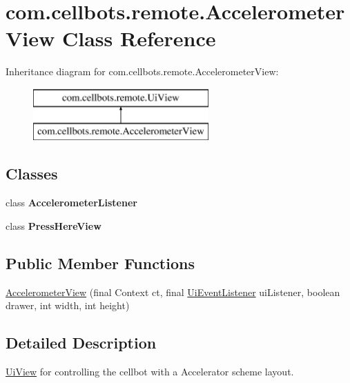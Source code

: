 \hypertarget{classcom_1_1cellbots_1_1remote_1_1_accelerometer_view}{\section{com.\-cellbots.\-remote.\-Accelerometer\-View Class Reference}
\label{classcom_1_1cellbots_1_1remote_1_1_accelerometer_view}
}
Inheritance diagram for com.\-cellbots.\-remote.\-Accelerometer\-View\-:\begin{figure}[H]
\begin{center}
\leavevmode
\includegraphics[height=2.000000cm]{classcom_1_1cellbots_1_1remote_1_1_accelerometer_view}
\end{center}
\end{figure}
\subsection*{Classes}
\begin{DoxyCompactItemize}
\item 
class {\bfseries Accelerometer\-Listener}
\item 
class {\bfseries Press\-Here\-View}
\end{DoxyCompactItemize}
\subsection*{Public Member Functions}
\begin{DoxyCompactItemize}
\item 
\hyperlink{classcom_1_1cellbots_1_1remote_1_1_accelerometer_view_a965761c3c06f21c278363186777bcd9c}{Accelerometer\-View} (final Context ct, final \hyperlink{interfacecom_1_1cellbots_1_1remote_1_1_ui_view_1_1_ui_event_listener}{Ui\-Event\-Listener} ui\-Listener, boolean drawer, int width, int height)
\end{DoxyCompactItemize}


\subsection{Detailed Description}
\hyperlink{classcom_1_1cellbots_1_1remote_1_1_ui_view}{Ui\-View} for controlling the cellbot with a Accelerator scheme layout.

